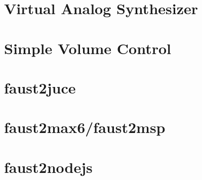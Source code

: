 \let\mypdfximage\pdfximage\def\pdfximage{\immediate\mypdfximage}\documentclass[twoside]{book}
\newcommand{\+}{\discretionary{\mbox{\scriptsize$\hookleftarrow$}}{}{}}
\begin{document}
\chapter{Virtual Analog Synthesizer}
\label{md__c_1__users_fab_src__github_branches__neural_amp_modeler_plugin_i_plug2__dependencies__build_b0c902fab41e07ea22d1fc1d72c70ad6}

\chapter{Simple Volume Control}
\label{md__c_1__users_fab_src__github_branches__neural_amp_modeler_plugin_i_plug2__dependencies__build_859f93086b2f288b3d5d7323e139fde4}

\chapter{faust2juce}
\label{md__c_1__users_fab_src__github_branches__neural_amp_modeler_plugin_i_plug2__dependencies__build_5f567ebd34cb8879590fcba1cc50121e}

\chapter{faust2max6/faust2msp}
\label{md__c_1__users_fab_src__github_branches__neural_amp_modeler_plugin_i_plug2__dependencies__build_27785e6cfc9fe995fb9c3cd2af964571}

\chapter{faust2nodejs}
\label{md__c_1__users_fab_src__github_branches__neural_amp_modeler_plugin_i_plug2__dependencies__build_3a0ed32fd5d781b68c1f7b5aa9d9b83e}

\end{document}

